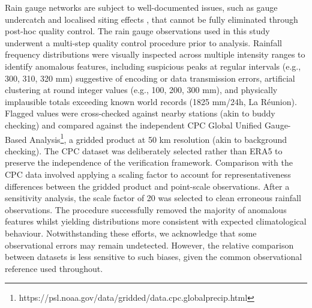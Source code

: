 \documentclass{ametsocV6.1}
\begin{document}
Rain gauge networks are subject to well-documented issues, such as gauge undercatch and localised siting effects \citep{Pollock_2018, Kochendorfer_2020}, that cannot be fully eliminated through post-hoc quality control. The rain gauge observations used in this study underwent a multi-step quality control procedure prior to analysis. Rainfall frequency distributions were visually inspected across multiple intensity ranges to identify anomalous features, including suspicious peaks at regular intervals (e.g., 300, 310, 320 mm) suggestive of encoding or data transmission errors, artificial clustering at round integer values (e.g., 100, 200, 300 mm), and physically implausible totals exceeding known world records (1825 mm/24h, La Réunion). Flagged values were cross-checked against nearby stations (akin to buddy checking) and compared against the independent CPC Global Unified Gauge-Based Analysis\footnote{https://psl.noaa.gov/data/gridded/data.cpc.globalprecip.html}, a gridded product at 50 km resolution (akin to background checking). The CPC dataset was deliberately selected rather than ERA5 to preserve the independence of the verification framework. Comparison with the CPC data involved applying a scaling factor to account for representativeness differences between the gridded product and point-scale observations. After a sensitivity analysis, the scale factor of 20 was selected to clean erroneous rainfall observations. The procedure successfully removed the majority of anomalous features whilst yielding distributions more consistent with expected climatological behaviour. Notwithstanding these efforts, we acknowledge that some observational errors may remain undetected. However, the relative comparison between datasets is less sensitive to such biases, given the common observational reference used throughout.
\end{document}
